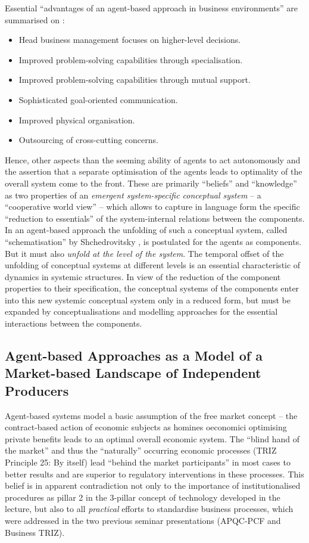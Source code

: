 \documentclass[11pt,a4paper]{article}
\begin{document}
Essential \enquote{advantages of an agent-based approach in business
  environments} are summarised on \cite[slide~37]{Haertel2021}:
\begin{itemize}
\item Head business management focuses on higher-level decisions.
\item Improved problem-solving capabilities through specialisation.
\item Improved problem-solving capabilities through mutual support.
\item Sophisticated goal-oriented communication.
\item Improved physical organisation.
\item Outsourcing of cross-cutting concerns.
\end{itemize}

Hence, other aspects than the seeming ability of agents to act autonomously
and the assertion that a separate optimisation of the agents leads to
optimality of the overall system come to the front. These are primarily
\enquote{beliefs} and \enquote{knowledge} as two properties of an
\emph{emergent system-specific conceptual system} -- a \enquote{cooperative
  world view} -- which allows to capture in language form the specific
\enquote{reduction to essentials} of the system-internal relations between the
components. In an agent-based approach the unfolding of such a conceptual
system, called \enquote{schematisation} by Shchedrovitsky \cite{MSM}, is
postulated for the agents as components. But it must also \emph{unfold at the
  level of the system}. The temporal offset of the unfolding of conceptual
systems at different levels is an essential characteristic of dynamics in
systemic structures. In view of the reduction of the component properties to
their specification, the conceptual systems of the components enter into this
new systemic conceptual system only in a reduced form, but must be expanded by
conceptualisations and modelling approaches for the essential interactions
between the components.

\subsection{Agent-based Approaches as a Model of a Market-based Landscape of
  Independent Producers} 

Agent-based systems model a basic assumption of the free market concept -- the
contract-based action of economic subjects as homines oeconomici optimising
private benefits leads to an optimal overall economic system. The
\enquote{blind hand of the market} and thus the \enquote{naturally} occurring
economic processes (TRIZ Principle 25: By itself) lead \enquote{behind the
  market participants} in most cases to better results and are superior to
regulatory interventions in these processes. This belief is in apparent
contradiction not only to the importance of institutionalised procedures as
pillar 2 in the 3-pillar concept of technology developed in the lecture, but
also to all \emph{practical} efforts to standardise business processes, which
were addressed in the two previous seminar presentations (APQC-PCF and
Business TRIZ).
\end{document}
